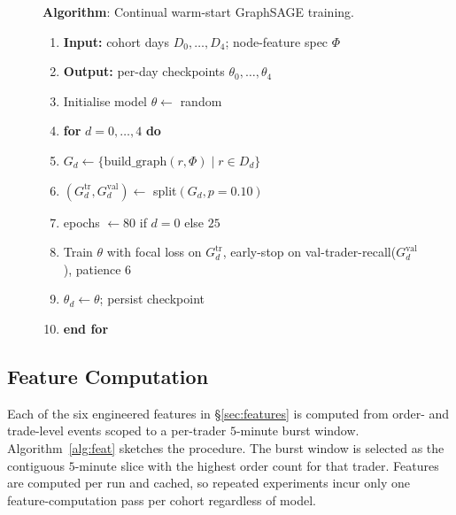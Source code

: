 \documentclass[10pt,twocolumn,letterpaper]{article}
\begin{document}
\begin{figure}[t]
\small
\noindent\textbf{Algorithm}: Continual warm-start GraphSAGE training.
\begin{enumerate}
\item \textbf{Input:} cohort days $D_0,\dots,D_4$; node-feature spec $\Phi$
\item \textbf{Output:} per-day checkpoints $\theta_0,\dots,\theta_4$
\item Initialise model $\theta\leftarrow$ random
\item \textbf{for} $d=0,\dots,4$ \textbf{do}
  \item $G_d \gets \{\text{build\_graph}(r,\Phi)\;|\;r \in D_d\}$
  \item $(G_d^{\text{tr}}, G_d^{\text{val}}) \gets$ split$(G_d, p=0.10)$
  \item epochs $\gets 80$ if $d=0$ else $25$
  \item Train $\theta$ with focal loss on $G_d^{\text{tr}}$,
    early-stop on val-trader-recall($G_d^{\text{val}}$),
    patience $6$
  \item $\theta_d \gets \theta$; persist checkpoint
\item \textbf{end for}
\end{enumerate}
\label{alg:train}
\end{figure}


\subsection{Feature Computation}
\label{sec:featcomp}
Each of the six engineered features in \S\ref{sec:features} is computed
from order- and trade-level events scoped to a per-trader \(5\)-minute
burst window. Algorithm~\ref{alg:feat} sketches the procedure. The
burst window is selected as the contiguous \(5\)-minute slice with the
highest order count for that trader. Features are computed per run and
cached, so repeated experiments incur only one feature-computation pass
per cohort regardless of model.
\end{document}
